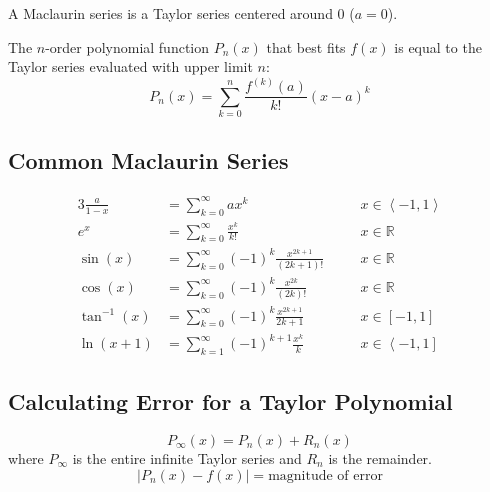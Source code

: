 \documentclass[12pt]{article}
\newcommand*{\R}{\mathbb{R}}
\newcommand*{\rmaskip}{\setlength{\abovedisplayskip}{0pt}}
\newcommand*{\rmbskip}{\setlength{\belowdisplayskip}{0pt}}
\newcommand*{\rmskip}{\rmaskip \rmbskip}
\newcommand*{\itan}{\tan^{-1}}
\newcommand*{\isum}[1][k]{\sum_{#1=0}^\infty}
\begin{document}
A Maclaurin series is a Taylor series centered around 0 (\(a = 0\)).

The \(n\)-order polynomial function \(P_n(x)\) that best fits \(f(x)\) is
equal to the Taylor series evaluated with upper limit \(n\):
\[
  P_n(x) = \sum_{k=0}^{n} \frac{f^{(k)}(a)}{k!}{(x-a)}^k
\]
\subsection*{Common Maclaurin Series}
{\rmskip\begin{alignat*}{3}
  \frac{a}{1-x} &= \isum ax^k &&\quad x \in \left<-1,1\right>\\
  e^x &= \isum \frac{x^k}{k!} &&\quad x \in \R\\
  \sin(x) &= \isum {(-1)}^k \frac{x^{2k+1}}{(2k+1)!} &&\quad x \in \R\\
  \cos(x) &= \isum {(-1)}^k \frac{x^{2k}}{(2k)!} &&\quad x \in \R\\
  \itan(x) &= \isum {(-1)}^k \frac{x^{2k+1}}{2k+1} &&\quad x \in [-1,1]\\
  \ln(x+1) &= \sum_{k=1}^\infty {(-1)}^{k+1} \frac{x^k}{k} &&\quad x \in
    \left<-1,1\right]
\end{alignat*}}%
\subsection*{Calculating Error for a Taylor Polynomial}
\[
  P_\infty(x) = P_n(x) + R_n(x)
\]
where \(P_\infty\) is the entire infinite Taylor series and \(R_n\) is the
remainder.
\[
  |P_n(x) - f(x)| = \text{magnitude of error}
\]
\end{document}
